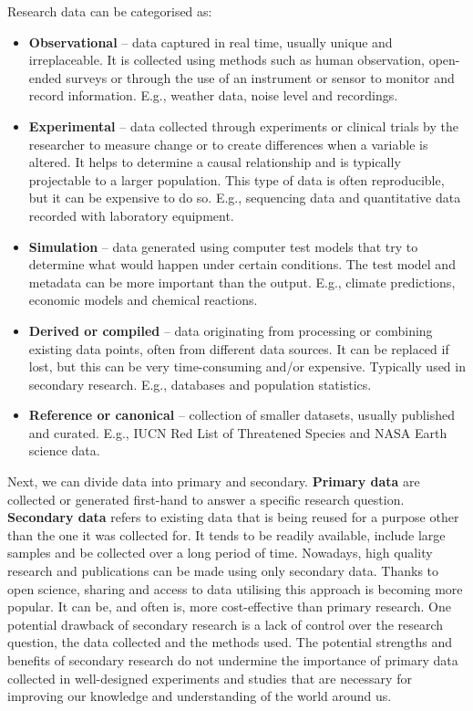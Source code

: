 \documentclass[
]{book}
\begin{document}
Research data can be categorised as:

\begin{itemize}
\item
  \textbf{Observational} -- data captured in real time, usually unique and irreplaceable. It is collected using methods such as human observation, open-ended surveys or through the use of an instrument or sensor to monitor and record information. E.g., weather data, noise level and recordings.
\item
  \textbf{Experimental} -- data collected through experiments or clinical trials by the researcher to measure change or to create differences when a variable is altered. It helps to determine a causal relationship and is typically projectable to a larger population. This type of data is often reproducible, but it can be expensive to do so. E.g., sequencing data and quantitative data recorded with laboratory equipment.
\item
  \textbf{Simulation} -- data generated using computer test models that try to determine what would happen under certain conditions. The test model and metadata can be more important than the output. E.g., climate predictions, economic models and chemical reactions.
\item
  \textbf{Derived or compiled} -- data originating from processing or combining existing data points, often from different data sources. It can be replaced if lost, but this can be very time-consuming and/or expensive. Typically used in secondary research. E.g., databases and population statistics.
\item
  \textbf{Reference or canonical} -- collection of smaller datasets, usually published and curated. E.g., IUCN Red List of Threatened Species and NASA Earth science data.
\end{itemize}

Next, we can divide data into primary and secondary. \textbf{Primary data} are collected or generated first-hand to answer a specific research question. \textbf{Secondary data} refers to existing data that is being reused for a purpose other than the one it was collected for. It tends to be readily available, include large samples and be collected over a long period of time. Nowadays, high quality research and publications can be made using only secondary data. Thanks to open science, sharing and access to data utilising this approach is becoming more popular. It can be, and often is, more cost-effective than primary research. One potential drawback of secondary research is a lack of control over the research question, the data collected and the methods used. The potential strengths and benefits of secondary research do not undermine the importance of primary data collected in well-designed experiments and studies that are necessary for improving our knowledge and understanding of the world around us.
\end{document}
